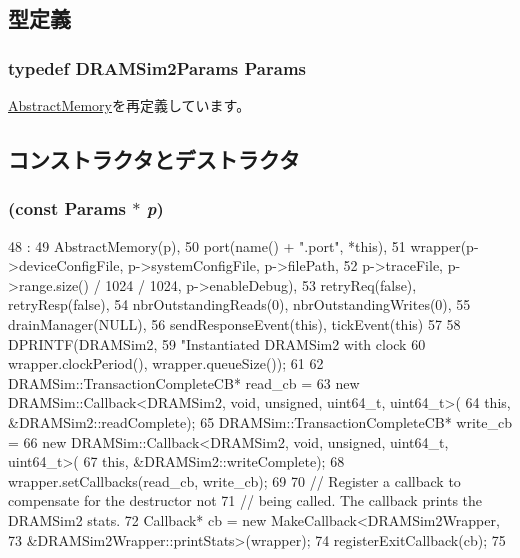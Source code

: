 \subsection{型定義}
\hypertarget{classDRAMSim2_ae66665a06c9d64a6ba0e56d589b74d6c}{
\subsubsection[{Params}]{\setlength{\rightskip}{0pt plus 5cm}typedef DRAMSim2Params {\bf Params}}}
\label{classDRAMSim2_ae66665a06c9d64a6ba0e56d589b74d6c}


\hyperlink{classAbstractMemory_ab4fcbcbcfef78d6bc871995f8eca40eb}{AbstractMemory}を再定義しています。

\subsection{コンストラクタとデストラクタ}
\hypertarget{classDRAMSim2_ab8d8de0105b7d92ea63130025ee2bc5a}{
\subsubsection[{DRAMSim2}]{ (const {\bf Params} $\ast$ {\em p})}}
\label{classDRAMSim2_ab8d8de0105b7d92ea63130025ee2bc5a}



\begin{DoxyCode}
48                                   :
49     AbstractMemory(p),
50     port(name() + ".port", *this),
51     wrapper(p->deviceConfigFile, p->systemConfigFile, p->filePath,
52             p->traceFile, p->range.size() / 1024 / 1024, p->enableDebug),
53     retryReq(false), retryResp(false),
54     nbrOutstandingReads(0), nbrOutstandingWrites(0),
55     drainManager(NULL),
56     sendResponseEvent(this), tickEvent(this)
57 {
58     DPRINTF(DRAMSim2,
59             "Instantiated DRAMSim2 with clock %
60             wrapper.clockPeriod(), wrapper.queueSize());
61 
62     DRAMSim::TransactionCompleteCB* read_cb =
63         new DRAMSim::Callback<DRAMSim2, void, unsigned, uint64_t, uint64_t>(
64             this, &DRAMSim2::readComplete);
65     DRAMSim::TransactionCompleteCB* write_cb =
66         new DRAMSim::Callback<DRAMSim2, void, unsigned, uint64_t, uint64_t>(
67             this, &DRAMSim2::writeComplete);
68     wrapper.setCallbacks(read_cb, write_cb);
69 
70     // Register a callback to compensate for the destructor not
71     // being called. The callback prints the DRAMSim2 stats.
72     Callback* cb = new MakeCallback<DRAMSim2Wrapper,
73         &DRAMSim2Wrapper::printStats>(wrapper);
74     registerExitCallback(cb);
75 }

\end{DoxyCode}


